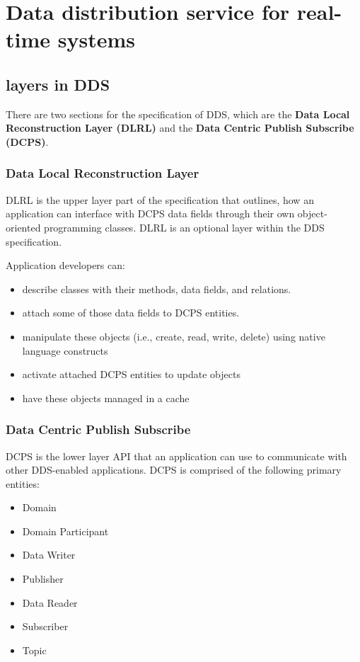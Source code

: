 \section{Data distribution service for real-time systems}

\subsection{layers in DDS}

There are two sections for the specification of DDS, which are the \textbf{Data Local Reconstruction Layer (DLRL)} and the \textbf{Data Centric Publish Subscribe (DCPS)}.

\subsubsection{Data Local Reconstruction Layer}
DLRL is the upper layer part of the specification that outlines, how an application can interface with DCPS data fields through their own object-oriented programming classes. DLRL is an optional layer within the DDS specification.

Application developers can:
\begin{itemize}
\item describe classes with their methods, data fields, and relations.
\item attach some of those data fields to DCPS entities.
\item manipulate these objects (i.e., create, read, write, delete) using native language constructs
\item activate attached DCPS entities to update objects
\item have these objects managed in a cache
\end{itemize}

\subsubsection{Data Centric Publish Subscribe}	
DCPS is the lower layer API that an application can use to communicate with other DDS-enabled applications.
DCPS is comprised of the following primary entities:
\begin{itemize}
\item Domain
\item Domain Participant
\item Data Writer
\item Publisher
\item Data Reader
\item Subscriber
\item Topic
\end{itemize}

